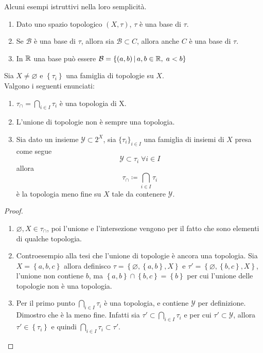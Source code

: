 \begin{example}
	Alcuni esempi istruttivi nella loro semplicità.
	\begin{enumerate}
		\item Dato uno spazio topologico $(X,\tau)$, $\tau$ è una base di $\tau$. 
		\item Se $\mathcal{B}$ è una base di $\tau$, allora sia $\mathcal{B} \subset C$, allora anche $C$ è una base di $\tau$.
		\item In $\mathbb{R}$ una base può essere $\mathcal{B} = \left\{(a,b) \,\middle|\, a,b \in \mathbb{R}, \; a < b \right\}$
	\end{enumerate}
\end{example}

\begin{proposition}
	Sia $X \neq \varnothing$ e $\left\{\tau_i\right\}$ una famiglia di topologie su $X$. \\ Valgono i seguenti enunciati:
	\begin{enumerate} 
		\item $\tau_\cap = \bigcap_{i \in I} \tau_i$ è una topologia di X.
		\item L'unione di topologie non è sempre una topologia.
		\item Sia dato un insieme $\mathcal{Y} \subset 2^X$, sia $\{\tau_i\}_{i \in I}$ una famiglia di insiemi di $X$ presa come segue
		\begin{equation*}
			\mathcal{Y} \subset \tau_i \; \forall i \in I
		\end{equation*}
		allora 
		\begin{equation*}
			\tau_\cap \coloneqq \bigcap_{i \in I} \tau_i	
		\end{equation*}
		 è la topologia meno fine su $X$ tale da contenere $\mathcal{Y}$.
	\end{enumerate}
\end{proposition}
\begin{proof} \
	\begin{enumerate}
		\item $\varnothing, X \in \tau_\cap$, poi l'unione e l'intersezione vengono per il fatto che sono elementi di qualche topologia.
		\item Controesempio alla tesi che l'unione di topologie è ancora una topologia. Sia $X = \left\{a,b,c\right\}$ allora definisco $\tau = \left\{\varnothing, \left\{a,b\right\}, X\right\}$ e $\tau' = \left\{\varnothing, \left\{b,c\right\}, X\right\}$, l'unione non contiene $b$, ma $\left\{a,b\right\} \cap \left\{b,c\right\} = \left\{b\right\}$ per cui l'unione delle topologie non è una topologia.
		\item Per il primo punto $\bigcap_{i \in I} \tau_i$ è una topologia, e contiene $\mathcal{Y}$ per definizione. \\ Dimostro che è la meno fine. Infatti sia $\tau' \subset \bigcap_{i \in I} \tau_i$ e per cui $\tau' \subset \mathcal{Y}$, allora $\tau' \in \left\{\tau_i\right\}$ e quindi $\bigcap_{i \in I} \tau_i \subset \tau'$. 
	\end{enumerate}	
\end{proof}


